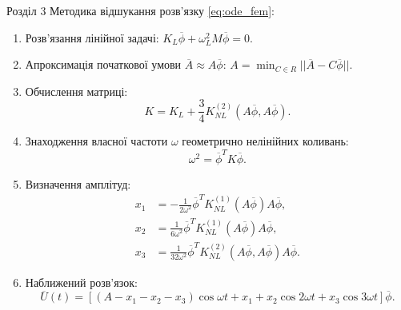 \documentclass[handout, 8pt]{beamer}
\numberwithin{figure}{section}
\numberwithin{equation}{section}
\numberwithin{table}{section}
\begin{document}
\begin{frame}{Розділ 3}
Методика відшукання розв'язку \eqref{eq:ode_fem}:
\begin{enumerate}
	\item Розв’язання лінійної задачі:
	$K_L\overline{\phi}+\omega_L^2 M \overline{\phi}=0$. 
	\item Апроксимація початкової умови $\overline{A}\approx A\overline{\phi}$: 
	$\displaystyle A=\min_{C \in R} ||\overline{A}-C\overline{\phi}||$.\\
	\item Обчислення матриці:
	\begin{equation}\label{eq:Kmatrix}
	K = K_L + \frac34 K_{NL}^{(2)}\left( A\overline{\phi},A\overline{\phi} \right). 
	\end{equation}
	\item Знаходження власної частоти $\omega$ геометрично нелінійних коливань:
	\begin{equation}\label{eq:omega_nonlin}
	\omega^2=\overline{\phi}^T K \overline{\phi}.
	\end{equation}
	\item Визначення амплітуд:
	 \begin{equation}
 \begin{aligned}
x_1&=-\frac{1}{2\omega ^2}\overline{\phi}^T K_{NL}^{(1)}\left( A\overline{\phi} \right) A\overline{\phi},\\
x_2&=\frac{1}{6\omega ^2}\overline{\phi}^T K_{NL}^{(1)}\left( A\overline{\phi} \right) A\overline{\phi},\\
x_3&=\frac{1}{32\omega ^2}\overline{\phi}^T K_{NL}^{(2)}\left( A\overline{\phi},A\overline{\phi} \right) A\overline{\phi}.
\end{aligned}
	 \end{equation}
	\item Наближений розв'язок:
	\begin{equation}
	\overline{U}\left(t\right)=\left[\left(A-x_1-x_2-x_3\right)\cos \omega t + x_1+x_2\cos 2 \omega t+x_3\cos 3 \omega t\right]\overline{\phi}.
	\end{equation}
\end{enumerate}
\end{frame}
\end{document}
